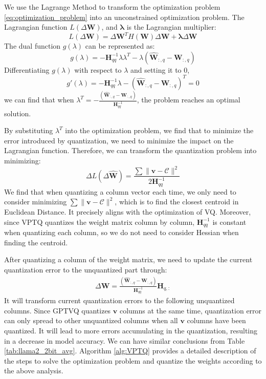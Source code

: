 We use the Lagrange Method to transform the optimization problem \ref{eq:optimization_problem} into an unconstrained optimization problem. The Lagrangian function $L(\Delta \mathbf{W})$, and $\mathbf{\lambda}$ is the Lagrangian multiplier:
\begin{equation*}
    L(\Delta \mathbf{W}) = \Delta \mathbf{W}^T H (\mathbf{W}) \Delta \mathbf{W} + \mathbf{\lambda} \Delta \mathbf{W} \label{eq:lagrangian}
\end{equation*}
The dual function $g(\lambda)$ can be represented as:
\begin{equation*}
    g(\lambda) = -\mathbf{H}^{-1}_{qq} \lambda \lambda^T  - \lambda  (\hat{\mathbf{W}}_{:,q} - \mathbf{W}_{:,q}) 
\end{equation*}
Differentiating $g(\lambda)$ with respect to $\lambda$ and setting it to $0$, 
\begin{equation*}
    g'(\lambda) = -\mathbf{H}^{-1}_{qq} \lambda -  (\hat{\mathbf{W}}_{:,q} - \mathbf{W}_{:,q}) ^T = 0
\end{equation*}
we can find that when $\lambda^T = - \frac{(\hat{\mathbf{W}}_{:,q} - \mathbf{W}_{:,q})}{\mathbf{H}^{-1}_{qq}}$, the problem reaches an optimal solution.

By substituting $\lambda^T$ into the optimization problem, we find that to minimize the error introduced by quantization, we need to minimize the impact on the Lagrangian function. Therefore, we can transform the quantization problem into minimizing:
\begin{equation*}
    \Delta L (\Delta \mathbf{\hat{\mathbf{W}}}) = \frac{\sum \| \boldsymbol{v} - \mathcal{C} \|^2}{ 2 \mathbf{H}^{-1}_{qq}} \label{eq:lagrangian_obj}
\end{equation*}
We find that when quantizing a column vector each time, we only need to consider minimizing $\sum \| \boldsymbol{v} - \mathcal{C} \|^2$, which is to find the closest centroid in Euclidean Distance.
It precisely aligns with the optimization of VQ.
Moreover, since VPTQ quantizes the weight matrix column by column, $\mathbf{H}^{-1}_{qq}$ is constant when quantizing each column, so we do not need to consider Hessian when finding the centroid.


After quantizing a column of the weight matrix, we need to update the current quantization error to the unquantized part through:
\begin{equation*}
    \begin{aligned}
    \Delta \mathbf{W} = \frac{(\mathbf{\hat{W}}_{:,q} - \mathbf{W}_{:,q})}{\mathbf{H}^{-1}_{qq}} \mathbf{H}_{q,:}
    \end{aligned}
\end{equation*}
It will transform current quantization errors to the following unquantized columns. 
Since GPTVQ quantizes $\boldsymbol{v}$ columns at the same time, quantization error can only spread to other unquantized columns when all $\boldsymbol{v}$ columns have been quantized.
It will lead to more errors accumulating in the quantization, resulting in a decrease in model accuracy. 
We can have similar conclusions from Table \ref{tab:llama2_2bit_avg}. 
Algorithm \ref{alg:VPTQ} provides a detailed description of the steps to solve the optimization problem and quantize the weights according to the above analysis. 


